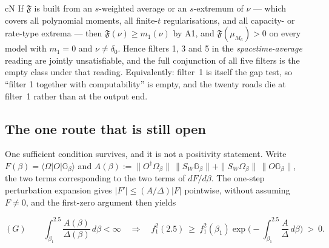 \begin{claimbox}{cN}
\label{thm:ng-d06t3}
If $\mathfrak F$ is built from an $s$-weighted average or an $s$-extremum of $\nu$ --- which covers all
polynomial moments, all finite-$t$ regularisations, and all capacity- or rate-type extrema --- then
$\mathfrak F(\nu)\ge m_1(\nu)$ by A1, and $\mathfrak F(\mu_{M_6})>0$ on every model with $m_1=0$ and
$\nu\neq\delta_0$. Hence filters 1, 3 and 5 in the \emph{spacetime-average} reading are jointly
unsatisfiable, and the full conjunction of all five filters is the empty class under that reading.
Equivalently: filter~1 is itself the gap test, so ``filter 1 together with computability'' is empty,
and the twenty roads die at filter~1 rather than at the output end.
\end{claimbox}


\subsection{The one route that is still open}
\label{sec:ng-open}

One sufficient condition survives, and it is not a positivity statement. Write
$F(\beta)=\langle\Omega|O|\mathbb G_\beta\rangle$ and
$A(\beta):=\|O^\dagger\Omega_\beta\|\,\|S_W\mathbb G_\beta\|+\|S_W\Omega_\beta\|\,\|O\mathbb G_\beta\|$,
the two terms corresponding to the two terms of $dF/d\beta$. The one-step perturbation expansion gives
$|F'|\le(A/\Delta)|F|$ pointwise, without assuming $F\neq0$, and the first-zero argument then yields

\begin{equation}
(G)\qquad
\int_{\beta_1}^{2.5}\frac{A(\beta)}{\Delta(\beta)}\,d\beta<\infty
\quad\Longrightarrow\quad
f_1^2(2.5)\ \ge\ f_1^2(\beta_1)\exp\Big(-\int_{\beta_1}^{2.5}\frac{A}{\Delta}\,d\beta\Big)\ >\ 0 .
\label{eq:ng-G}
\end{equation}

